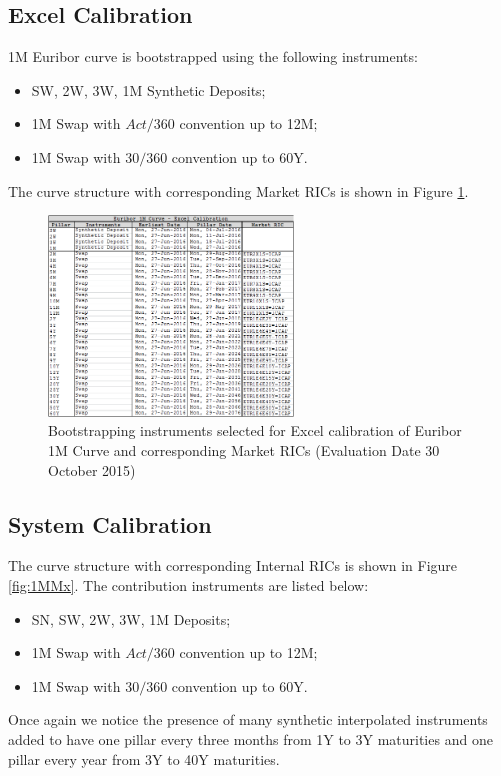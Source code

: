 \subsection{Excel Calibration}

1M Euribor curve is bootstrapped using the following instruments:
\begin{itemize}
\item SW, 2W, 3W, 1M Synthetic Deposits; 
\item 1M Swap with $Act/360$ convention up to 12M;
\item 1M Swap with $30/360$ convention up to 60Y.
\end{itemize}
The curve structure with corresponding Market RICs is shown in Figure \ref{fig:1MExcel}.

\begin{figure}
\centering
\includegraphics[width=0.58\textwidth]{images/1MExcel.png}
\caption{Bootstrapping instruments selected for Excel calibration of Euribor 1M Curve and corresponding Market RICs (Evaluation Date 30 October 2015)}
\label{fig:1MExcel}
\end{figure}

\subsection{System Calibration}

The curve structure with corresponding Internal RICs is shown in Figure \ref{fig:1MMx}. The contribution instruments are listed below:
\begin{itemize}
\item SN, SW, 2W, 3W, 1M Deposits; 
\item 1M Swap with $Act/360$ convention up to 12M;
\item 1M Swap with $30/360$ convention up to 60Y.
\end{itemize}
Once again we notice the presence of many synthetic interpolated instruments added to have one pillar every three months from 1Y to 3Y maturities and one pillar every year from 3Y to 40Y maturities. 

